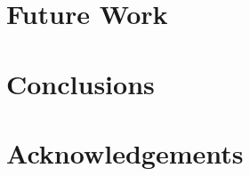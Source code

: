 
\section{Future Work} \label{sec:future}

\section{Conclusions} \label{sec:conc}

\section{Acknowledgements} \label{sec:ack}

